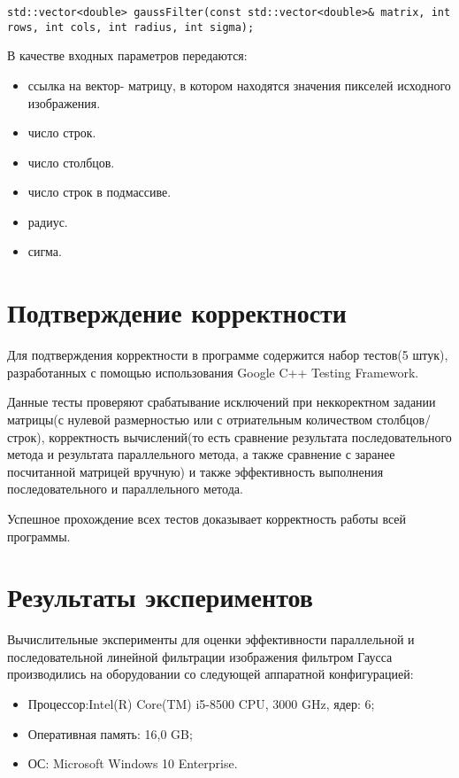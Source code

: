 \documentclass{report}
\begin{document}
\begin{lstlisting}
std::vector<double> gaussFilter(const std::vector<double>& matrix, int rows, int cols, int radius, int sigma);
\end{lstlisting}
\par В качестве входных параметров передаются:
\begin{itemize}
\item ссылка на вектор- матрицу, в котором находятся значения пикселей исходного изображения.
\item число строк.
\item число столбцов.
\item число строк в подмассиве.
\item радиус.
\item сигма.
\end{itemize}
\newpage

\section*{Подтверждение корректности}
Для подтверждения корректности в программе содержится набор тестов(5 штук), разработанных с помощью использования Google C++ Testing Framework.
\par Данные тесты проверяют срабатывание исключений при неккоректном задании матрицы(с нулевой размерностью или с отриательным количеством столбцов/строк), корректность вычислений(то есть сравнение результата последовательного метода и результата параллельного метода, а также сравнение с заранее посчитанной матрицей вручную) и также эффективность выполнения последовательного и параллельного метода.
\par Успешное прохождение всех тестов доказывает корректность работы всей программы.
\newpage

\section*{Результаты экспериментов}
Вычислительные эксперименты для оценки эффективности параллельной и последовательной линейной фильтрации изображения фильтром Гаусса производились на оборудовании со следующей аппаратной конфигурацией:

\begin{itemize}
\item Процессор:Intel(R) Core(TM) i5-8500 CPU, 3000 GHz, ядер: 6;
\item Оперативная память: 16,0 GB;
\item ОС: Microsoft Windows 10 Enterprise.
\end{itemize}
\end{document}
